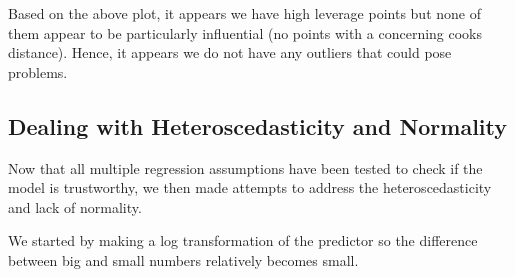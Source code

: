 \documentclass[
]{article}
\begin{document}
Based on the above plot, it appears we have high leverage points but
none of them appear to be particularly influential (no points with a
concerning cooks distance). Hence, it appears we do not have any
outliers that could pose problems.

\subsection{Dealing with Heteroscedasticity and
Normality}\label{dealing-with-heteroscedasticity-and-normality}

Now that all multiple regression assumptions have been tested to check
if the model is trustworthy, we then made attempts to address the
heteroscedasticity and lack of normality.

We started by making a log transformation of the predictor so the
difference between big and small numbers relatively becomes small.
\end{document}
